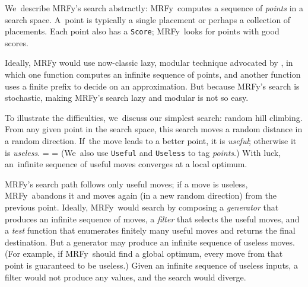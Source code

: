 \documentclass[nonatbib,preprint,blockstyle,times]{sigplanconf}
\newcommand\mrfy{MRFy} %
\newif\ifverbatimsmall
\newcommand\smallverbatiminput[1]{%
  \everypar=\expandafter{\the\everypar
       \verbatimsmallfalse
       \topsep=\standardvspace}%
  \topsep=0.78\topsep
  \verbatimsmalltrue}
\begin{document}
We~describe \mrfy's search abstractly: \mrfy\ computes a sequence
of \emph{points} in a search space.
A~point is typically a single placement or perhaps a collection of
placements. 
Each point also has a \texttt{Score}; \mrfy\ looks for points with
good scores.

Ideally, MRFy would use now-classic lazy, modular
technique advocated by \citet{hughes:why}, in which one function
computes an infinite sequence of points, and another function
uses a finite prefix to decide on an approximation.
But because MRFy's search is stochastic, 
making MRFy's search lazy and modular is not so easy.

To illustrate the difficulties, we~discuss our simplest search:
random hill climbing.
From any given point in the search space, this search moves a random
distance in a random 
direction.
If~the move leads to a better point, it
is \emph{useful};
otherwise it is \emph{useless}.
\smallverbatiminput{utility}
(We~also use \texttt{Useful} and \texttt{Useless} to tag \emph{points}.)
With luck, an~infinite sequence of useful moves converges
at a local optimum.

\mrfy's search path follows only useful moves;
if a move is useless, 
\mrfy\ abandons it and moves again (in a new random direction) from the
previous point.
Ideally, \mrfy\ would search by composing a \emph{generator}
that produces an infinite sequence of moves, 
a \emph{filter} that selects the useful moves, and 
a \emph{test} function that enumerates finitely many useful moves
and returns the final destination.
But a generator may produce an infinite sequence of useless moves.
(For example, if \mrfy\ should find a global optimum, every move from
that point is guaranteed to be useless.)
Given an infinite sequence of useless inputs, a filter would not
produce any values, and the search would diverge.
\end{document}
